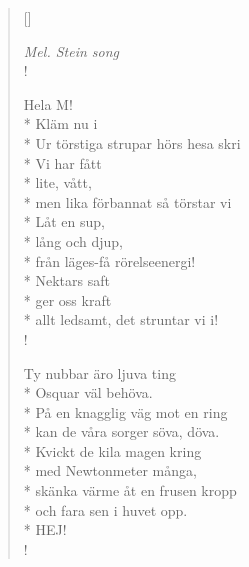 
\settowidth{\versewidth}{Ur törstiga strupar hörs hesa skri}



\begin{verse}[\versewidth]


\flagverse{}
\emph{Mel. Stein song}\\!



Hela M!\\*
Kläm nu i\\*
Ur törstiga strupar hörs hesa skri\\*
Vi har fått\\*
lite, vått,\\*
men lika förbannat så törstar vi\\*
Låt en sup,\\*
lång och djup,\\*
från läges-få rörelseenergi!\\*
Nektars saft\\*
ger oss kraft\\*
allt ledsamt, det struntar vi i!\\!

Ty nubbar äro ljuva ting\\*
Osquar väl behöva.\\*
På en knagglig väg mot en ring\\*
kan de våra sorger söva, döva.\\*
Kvickt de kila magen kring\\*
med Newtonmeter många,\\*
skänka värme åt en frusen kropp\\*
och fara sen i huvet opp.\\*
HEJ!\\!


\end{verse}

